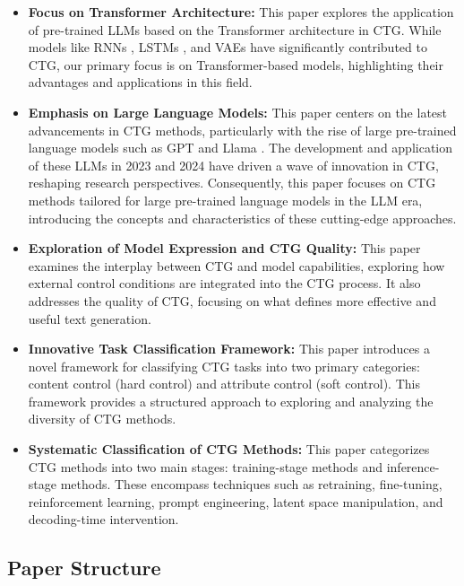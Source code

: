 \documentclass[acmsmall, screen]{acmart}
\begin{document}
\begin{itemize}
    \item \textbf{Focus on Transformer Architecture:} This paper explores the application of pre-trained LLMs based on the Transformer architecture \cite{vaswani_nips17_transformer} in CTG. While models like RNNs \cite{rumelhart_1986_rnn}, LSTMs \cite{hochreiter_1997_lstm}, and VAEs \cite{kingma_arxiv13_vae} have significantly contributed to CTG, our primary focus is on Transformer-based models, highlighting their advantages and applications in this field.

    \item \textbf{Emphasis on Large Language Models:} This paper centers on the latest advancements in CTG methods, particularly with the rise of large pre-trained language models such as GPT \cite{tom_nips20_gpt} and Llama \cite{touvron_arxiv23_llama}. The development and application of these LLMs in 2023 and 2024 have driven a wave of innovation in CTG, reshaping research perspectives. Consequently, this paper focuses on CTG methods tailored for large pre-trained language models in the LLM era, introducing the concepts and characteristics of these cutting-edge approaches.

    \item \textbf{Exploration of Model Expression and CTG Quality:} This paper examines the interplay between CTG and model capabilities, exploring how external control conditions are integrated into the CTG process. It also addresses the quality of CTG, focusing on what defines more effective and useful text generation. 

    \item \textbf{Innovative Task Classification Framework:} This paper introduces a novel framework for classifying CTG tasks into two primary categories: content control (hard control) and attribute control (soft control). This framework provides a structured approach to exploring and analyzing the diversity of CTG methods.
    
    \item \textbf{Systematic Classification of CTG Methods:} This paper categorizes CTG methods into two main stages: training-stage methods and inference-stage methods. These encompass techniques such as retraining, fine-tuning, reinforcement learning, prompt engineering, latent space manipulation, and decoding-time intervention.
\end{itemize}

\subsection{Paper Structure}
\end{document}

